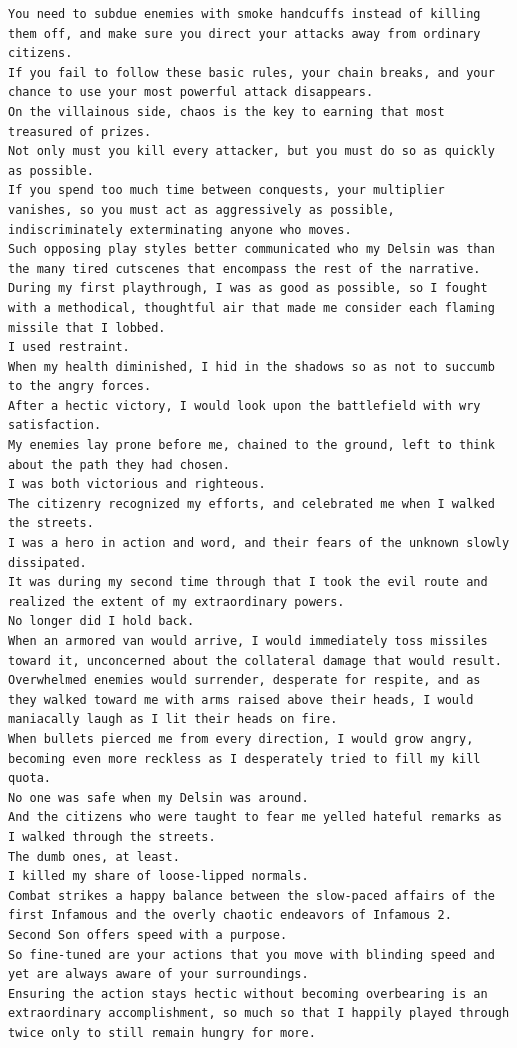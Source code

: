 \documentclass[BTech]{nitgoathesis}
\begin{document}
\begin{lstlisting}[basicstyle=\scriptsize]
You need to subdue enemies with smoke handcuffs instead of killing them off, and make sure you direct your attacks away from ordinary citizens.
If you fail to follow these basic rules, your chain breaks, and your chance to use your most powerful attack disappears.
On the villainous side, chaos is the key to earning that most treasured of prizes.
Not only must you kill every attacker, but you must do so as quickly as possible.
If you spend too much time between conquests, your multiplier vanishes, so you must act as aggressively as possible, indiscriminately exterminating anyone who moves.
Such opposing play styles better communicated who my Delsin was than the many tired cutscenes that encompass the rest of the narrative.
During my first playthrough, I was as good as possible, so I fought with a methodical, thoughtful air that made me consider each flaming missile that I lobbed.
I used restraint.
When my health diminished, I hid in the shadows so as not to succumb to the angry forces.
After a hectic victory, I would look upon the battlefield with wry satisfaction.
My enemies lay prone before me, chained to the ground, left to think about the path they had chosen.
I was both victorious and righteous.
The citizenry recognized my efforts, and celebrated me when I walked the streets.
I was a hero in action and word, and their fears of the unknown slowly dissipated.
It was during my second time through that I took the evil route and realized the extent of my extraordinary powers.
No longer did I hold back.
When an armored van would arrive, I would immediately toss missiles toward it, unconcerned about the collateral damage that would result.
Overwhelmed enemies would surrender, desperate for respite, and as they walked toward me with arms raised above their heads, I would maniacally laugh as I lit their heads on fire.
When bullets pierced me from every direction, I would grow angry, becoming even more reckless as I desperately tried to fill my kill quota.
No one was safe when my Delsin was around.
And the citizens who were taught to fear me yelled hateful remarks as I walked through the streets.
The dumb ones, at least.
I killed my share of loose-lipped normals.
Combat strikes a happy balance between the slow-paced affairs of the first Infamous and the overly chaotic endeavors of Infamous 2.
Second Son offers speed with a purpose.
So fine-tuned are your actions that you move with blinding speed and yet are always aware of your surroundings.
Ensuring the action stays hectic without becoming overbearing is an extraordinary accomplishment, so much so that I happily played through twice only to still remain hungry for more.

\end{lstlisting}
\end{document}
